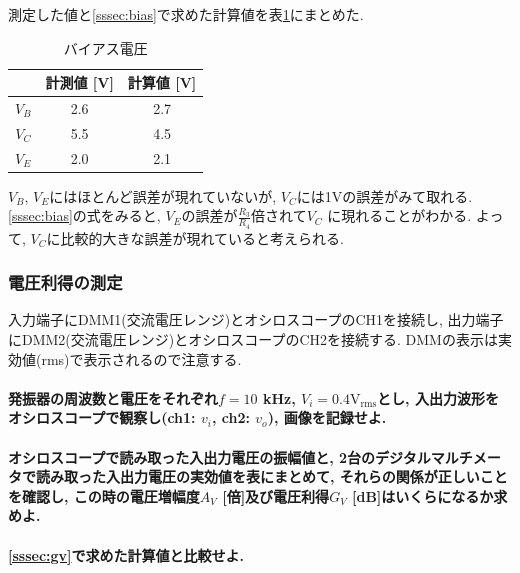 \documentclass[titlepage]{jsarticle}
\begin{document}
                測定した値と\ref{sssec:bias}で求めた計算値を表\ref{tab:bias}にまとめた.

                \begin{table}[h]
                    \caption{バイアス電圧}
                    \label{tab:bias}
                    \centering
                    \begin{tabular}{c||cc} \hline
                        & 計測値 [V] & 計算値 [V] \\ \hline
                        $V_B$ & 2.6 & 2.7 \\
                        $V_C$ & 5.5 & 4.5 \\
                        $V_E$ & 2.0 & 2.1 \\ \hline
                    \end{tabular}
                \end{table}

                $V_B$, $V_E$にはほとんど誤差が現れていないが, $V_C$には1Vの誤差がみて取れる.
                \ref{sssec:bias}の式をみると, $V_E$の誤差が$\displaystyle\frac{R_3}{R_4}$倍されて$V_C$
                に現れることがわかる. よって, $V_C$に比較的大きな誤差が現れていると考えられる.

        \subsubsection{電圧利得の測定}
            入力端子にDMM1(交流電圧レンジ)とオシロスコープのCH1を接続し,
            出力端子にDMM2(交流電圧レンジ)とオシロスコープのCH2を接続する.
            DMMの表示は実効値(rms)で表示されるので注意する.

            \paragraph{発振器の周波数と電圧をそれぞれ$f = 10$ kHz, $V_i = 0.4 \mathrm{V_{rms}}$とし, 入出力波形をオシロスコープで観察し(ch1: $v_i$, ch2: $v_o$), 画像を記録せよ.}
            \paragraph{オシロスコープで読み取った入出力電圧の振幅値と, 2台のデジタルマルチメータで読み取った入出力電圧の実効値を表にまとめて, それらの関係が正しいことを確認し, この時の電圧増幅度$A_V$ [倍]及び電圧利得$G_V$ [dB]はいくらになるか求めよ.}
            \paragraph{\ref{sssec:gv}で求めた計算値と比較せよ.}
            \mbox{} \\
\end{document}
